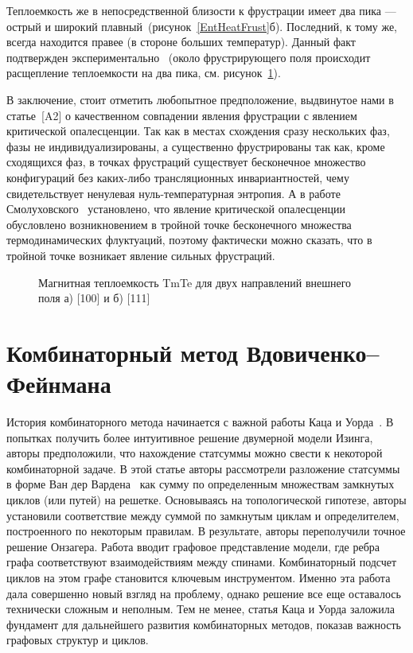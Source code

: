 Теплоемкость же в непосредственной близости к фрустрации имеет два пика --- острый и широкий плавный~(рисунок~\ref{EntHeatFrust}б). Последний, к тому же, всегда находится правее (в стороне больших температур). Данный факт подтвержден экспериментально~\cite{matsumura1997} (около фрустрирующего поля происходит расщепление теплоемкости на два пика, см. рисунок~\ref{new1}). 

В заключение, стоит отметить любопытное предположение, выдвинутое нами в  статье~[A2] о качественном совпадении явления фрустрации с явлением критической опалесценции. Так как в местах схождения сразу нескольких фаз, фазы не индивидуализированы, а существенно фрустрированы так как, кроме сходящихся фаз, в точках фрустраций существует бесконечное множество конфигураций без каких-либо трансляционных инвариантностей, чему свидетельствует ненулевая нуль-температурная энтропия. А в работе Смолуховского~\cite{smoluchowski1907} установлено, что явление критической опалесценции обусловлено возникновением в тройной точке бесконечного множества термодинамических флуктуаций, поэтому фактически можно сказать, что в тройной точке возникает явление сильных фрустраций.

 \begin{figure}[h]
 	\caption{Магнитная теплоемкость TmTe для двух направлений внешнего поля а) [100] и б) [111]~\cite{matsumura1997}}
 	\label{new1}
 \end{figure}

\section{Комбинаторный метод Вдовиченко--Фейнмана}\label{sec:markup}

История комбинаторного метода начинается с важной работы Каца и Уорда~\cite{kac1952}. В попытках получить более интуитивное решение двумерной модели Изинга, авторы предположили, что нахождение статсуммы можно свести к некоторой комбинаторной задаче. В этой статье авторы рассмотрели разложение статсуммы в форме Ван дер Вардена~\cite{warden1941} как сумму по определенным множествам замкнутых циклов (или путей) на решетке. Основываясь на топологической гипотезе, авторы установили соответствие между суммой по замкнутым циклам и определителем, построенного по некоторым правилам. В результате, авторы переполучили точное решение Онзагера. Работа вводит графовое представление модели, где ребра графа соответствуют взаимодействиям между спинами. Комбинаторный подсчет циклов на этом графе становится ключевым инструментом. Именно эта работа дала совершенно новый взгляд на проблему, однако решение все еще оставалось технически сложным и неполным. Тем не менее, статья Каца и Уорда заложила фундамент для дальнейшего развития комбинаторных методов, показав важность графовых структур и циклов. 

